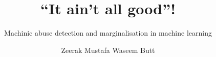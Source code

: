 \title{``It ain't all good''!}

\subtitle{Machinic abuse detection and marginalisation in machine learning}

\author{Zeerak Mustafa Waseem Butt}







     
